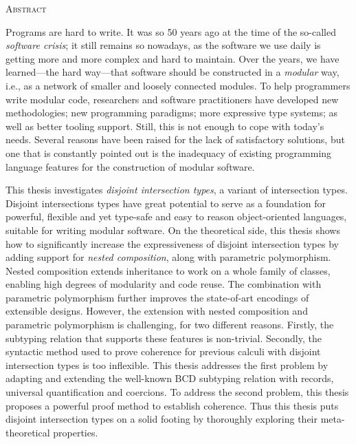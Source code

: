 \begin{center}
  \textsc{Abstract}
\end{center}

Programs are hard to write. It was so 50 years ago at the time of the so-called
\textit{software crisis}; it still remains so nowadays, as the software we use
daily is getting more and more complex and hard to maintain. Over the years, we
have learned---the hard way---that software should be constructed in a
\textit{modular} way, i.e., as a network of smaller and loosely connected
modules. To help programmers write modular code, researchers and software
practitioners have developed new methodologies; new programming paradigms; more
expressive type systems; as well as better tooling support. Still, this is not
enough to cope with today's needs. Several reasons have been raised for the lack
of satisfactory solutions, but one that is constantly pointed out is the
inadequacy of existing programming language features for the construction of
modular software.

This thesis investigates \textit{disjoint intersection types}, a variant of
intersection types. Disjoint intersections types have great potential to serve
as a foundation for powerful, flexible and yet type-safe and easy to reason
object-oriented languages, suitable for writing modular software. On the
theoretical side, this thesis shows how to significantly increase the
expressiveness of disjoint intersection types by adding support for
\textit{nested composition}, along with parametric polymorphism. Nested
composition extends inheritance to work on a whole family of classes, enabling
high degrees of modularity and code reuse. The combination with parametric
polymorphism further improves the state-of-art encodings of extensible designs.
However, the extension with nested composition and parametric polymorphism is
challenging, for two different reasons. Firstly, the subtyping relation that
supports these features is non-trivial. Secondly, the syntactic method used to
prove coherence for previous calculi with disjoint intersection types is too
inflexible. This thesis addresses the first problem by adapting and extending
the well-known BCD subtyping relation with records, universal quantification and
coercions. To address the second problem, this thesis proposes a powerful proof
method to establish coherence. Thus this thesis puts disjoint intersection types
on a solid footing by thoroughly exploring their meta-theoretical properties.

